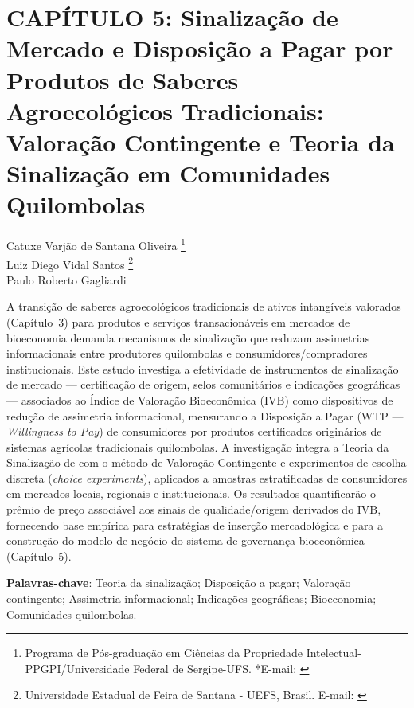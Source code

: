 \pagestyle{plain}

\chapter{CAPÍTULO 5: Sinalização de Mercado e Disposição a Pagar por Produtos de Saberes Agroecológicos Tradicionais: Valoração Contingente e Teoria da Sinalização em Comunidades Quilombolas}


\begin{flushright}
Catuxe Varjão de Santana Oliveira  \footnote[1]{Programa de Pós-graduação em Ciências da Propriedade Intelectual-PPGPI/Universidade Federal de Sergipe-UFS. *E-mail:  \href{mailto:catuxe@academico.ufs.br}{}}
\\[0.3cm]
Luiz Diego Vidal Santos \footnote[2]{Universidade Estadual de Feira de Santana - UEFS, Brasil. E-mail: \href{mailto:ldvsantos@uefs.br}{}}
\\[0.3cm]
Paulo Roberto Gagliardi \footnotemark[1]
\end{flushright}

{\renewcommand{\PRIVATEbookmarkthis}[1]{}%
\begin{resumoumacoluna}
A transição de saberes agroecológicos tradicionais de ativos intangíveis valorados (Capítulo~3) para produtos e serviços transacionáveis em mercados de bioeconomia demanda mecanismos de sinalização que reduzam assimetrias informacionais entre produtores quilombolas e consumidores/compradores institucionais. Este estudo investiga a efetividade de instrumentos de sinalização de mercado --- certificação de origem, selos comunitários e indicações geográficas --- associados ao Índice de Valoração Bioeconômica (IVB) como dispositivos de redução de assimetria informacional, mensurando a Disposição a Pagar (WTP --- \textit{Willingness to Pay}) de consumidores por produtos certificados originários de sistemas agrícolas tradicionais quilombolas. A investigação integra a Teoria da Sinalização de  com o método de Valoração Contingente \cite{Mitchell1989} e experimentos de escolha discreta (\textit{choice experiments}), aplicados a amostras estratificadas de consumidores em mercados locais, regionais e institucionais. Os resultados quantificarão o prêmio de preço associável aos sinais de qualidade/origem derivados do IVB, fornecendo base empírica para estratégias de inserção mercadológica e para a construção do modelo de negócio do sistema de governança bioeconômica (Capítulo~5).

\vspace{\onelineskip}
\noindent
\textbf{Palavras-chave}: Teoria da sinalização; Disposição a pagar; Valoração contingente; Assimetria informacional; Indicações geográficas; Bioeconomia; Comunidades quilombolas.
\end{resumoumacoluna}}

